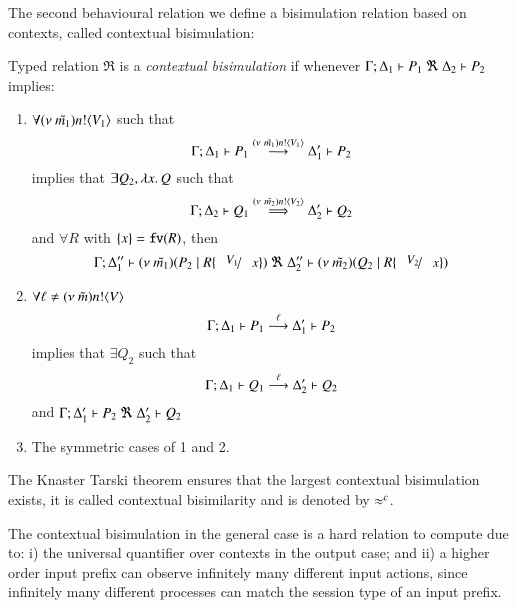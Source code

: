 The second behavioural relation we define a bisimulation
relation based on contexts, called contextual bisimulation:
%
\begin{definition}\rm
	\label{def:context_bis}
	Typed relation 
	$\Re$ is a {\em contextual bisimulation} if whenever
	$\horel{\Gamma}{\Delta_1}{P_1}{\ \Re\ }{\Delta_2}{P_2}$ implies:
	\begin{enumerate}
		\item	$\forall (\nu\ \tilde{m_1}) n ! \langle V_1 \rangle$ such that
			\[
				\Gamma; \Delta_1 \vdash P_1 \stackrel{(\nu\ \tilde{m_1}) n ! \langle V_1 \rangle}{\longrightarrow} \Delta_1' \vdash P_2
			\]
			implies that $\exists Q_2, \lambda x.\,Q$ such that
			\[
				\Gamma; \Delta_2 \vdash Q_1 \stackrel{(\nu\ \tilde{m_2}) n ! \langle V_2 \rangle}{\Longrightarrow} \Delta_2' \vdash Q_2
			\]
			and $\forall R$ with $\{x\} = \mathtt{fv}(R)$, 
			then
			\[
				\horel{\Gamma}{\Delta_1''}{\newsp{\tilde{m_1}}{P_2 \Par R\subst{V_1}{x}}}
				{\ \Re\ }
				{\Delta_2''}{\newsp{\tilde{m_2}}{Q_2 \Par R\subst{V_2}{x}}}
			\]
%
		\item	$\forall \ell \not= (\nu\ \tilde{m}) n ! \langle V \rangle$
			\[
				\Gamma; \Delta_1 \vdash P_1 \stackrel{\ell}{\longrightarrow} \Delta_1' \vdash P_2
			\]
			implies that $\exists Q_2$ such that
			\[
				\Gamma; \Delta_1 \vdash Q_1 \stackrel{\ell}{\longrightarrow} \Delta_2' \vdash Q_2
			\]
			and
			$\horel{\Gamma}{\Delta_1'}{P_2}{\ \Re\ }{\Delta_2'}{Q_2}$

		\item	The symmetric cases of 1 and 2.
	\end{enumerate}
%
	The Knaster Tarski theorem ensures that the largest contextual bisimulation exists,
	it is called contextual bisimilarity and is denoted by $\approx^{c}$.
\end{definition}
%
The contextual bisimulation in the general case
is a hard relation to compute due to:
i) the universal quantifier over contexts in the output case;
and
ii) a higher order input prefix can observe infinitely many
different input actions, since infinitely many different
processes can match the session type of an input prefix.



